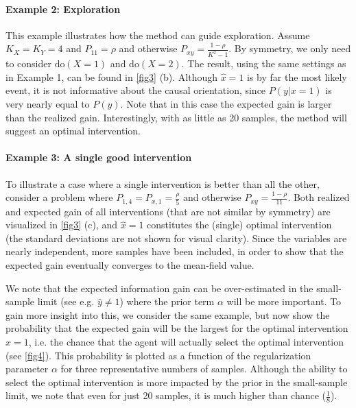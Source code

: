 \documentclass[letterpaper]{article} %
\newcommand{\doo}{\textrm{do}}
\begin{document}
\paragraph{Example 2: Exploration}
This example illustrates how the method can guide exploration. Assume $K_X = K_Y = 4$ and $P_{11} = \rho$ and otherwise $P_{xy} = \frac{1-\rho}{ K^2-1}$. By symmetry, we only need to consider $\doo(X=1)$ and $\doo(X=2)$. The result, using the same settings as in Example 1, can be found in \cref{fig3} (b). Although $\hat x =1$ is by far the most likely event, it is not informative about the causal orientation, since $P(y|x=1)$ is very nearly equal to $P(y)$. Note that in this case the expected gain is larger than the realized gain. Interestingly, with as little as 20 samples, the method will suggest an optimal intervention.


\paragraph{Example 3: A single good intervention}
To illustrate a case where a single intervention is better than all the other, consider a problem where $P_{1,4} = P_{x,1} = \frac{\rho}{5}$ and otherwise $P_{xy} = \frac{1-\rho}{11}$. Both realized and expected gain of all interventions (that are not similar by symmetry) are visualized in \cref{fig3} (c), and $\hat x = 1$ constitutes the (single) optimal intervention (the standard deviations are not shown for visual clarity). %
Since the variables are nearly independent, more samples have been included, in order to show that the expected  gain eventually converges to the mean-field value.


We note that the expected information gain can be over-estimated in the small-sample limit (see e.g. $\hat y \neq 1$) where the prior term $\alpha$ will be more important.
To gain more insight into this, we consider the same example, but now show the probability that the expected gain will be the largest for the optimal intervention $\hat x=1$, i.e. the chance that the agent will actually select the optimal intervention (see  \cref{fig4}). This probability is plotted as a function of the regularization parameter $\alpha$ for three representative numbers of samples. Although the ability to select the optimal intervention is more impacted by the prior in the small-sample limit, we note that even for just 20 samples, it is much higher than chance ($\frac{1}{8}$).
\end{document}
